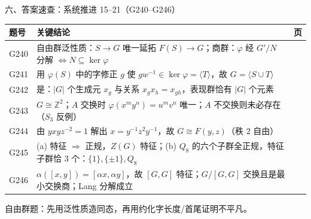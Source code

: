 \documentclass[aspectratio=169,10pt,fontset=none]{ctexbeamer}
\begin{document}
\begin{frame}[t]{六、答案速查：系统推进 15--21（G240--G246）}
  \centering
  \scriptsize
  \setlength{\tabcolsep}{3pt}
  \renewcommand{\arraystretch}{1.22}
  \begin{tabular}{@{}l p{10.0cm} c@{}}
    \toprule
    题号 & 关键结论 & 页\\
    \midrule
    G240 & 自由群泛性质：$S\to G$ 唯一延拓 $F(S)\to G$；商群：$\varphi$ 经 $G'/N$ 分解 $\iff N\subseteq\ker\varphi$ & \pageref{ex:G240}\\
    G241 & 用 $\varphi(S)$ 中的字修正 $g$ 使 $gw^{-1}\in\ker\varphi=\langle T\rangle$，故 $G=\langle S\cup T\rangle$ & \pageref{ex:G241}\\
    G242 & 是：$|G|$ 个生成元 $x_g$ 与关系 $x_gx_h=x_{gh}$，表现群恰有 $|G|$ 个元素 & \pageref{ex:G242}\\
    G243 & $G\cong\mathbb Z^2$；$A$ 交换时 $\varphi(x^my^n)=u^mv^n$ 唯一；$A$ 不交换则未必存在（$S_3$ 反例） & \pageref{ex:G243}\\
    G244 & 由 $yxyz^{-2}=1$ 解出 $x=y^{-1}z^2y^{-1}$，故 $G\cong F(y,z)$（秩 $2$ 自由） & \pageref{ex:G244}\\
    G245 & (a) 特征 $\Rightarrow$ 正规，$Z(G)$ 特征；(b) $Q_8$ 的六个子群全正规，特征子群恰 $3$ 个：$\{1\},\{\pm1\},Q_8$ & \pageref{ex:G245}\\
    G246 & $\alpha([x,y])=[\alpha x,\alpha y]$，故 $[G,G]$ 特征；$G/[G,G]$ 交换且是最小交换商；Lang 分解成立 & \pageref{ex:G246}\\
    \bottomrule
  \end{tabular}
  \par
  \vspace{0.3em}
  {\scriptsize\color{ink!70} 自由群题：先用泛性质造同态，再用约化字长度/首尾证明不平凡。}
\end{frame}
\end{document}

